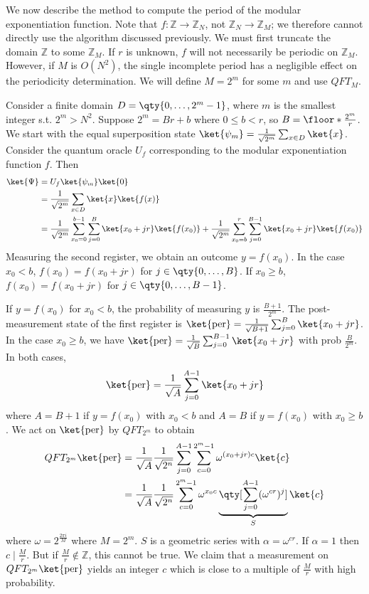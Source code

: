We now describe the method to compute the period of the modular exponentiation function.
Note that $f \colon \mathbb Z \to \mathbb Z_N$, not $\mathbb Z_N \to \mathbb Z_M$; we therefore cannot directly use the algorithm discussed previously.
We must first truncate the domain $\mathbb Z$ to some $\mathbb Z_M$.
If $r$ is unknown, $f$ will not necessarily be periodic on $\mathbb Z_M$.
However, if $M$ is $O(N^2)$, the single incomplete period has a negligible effect on the periodicity determination.
We will define $M = 2^m$ for some $m$ and use $QFT_M$.

Consider a finite domain $D = \qty{0, \dots, 2^m - 1}$, where $m$ is the smallest integer s.t. $2^m > N^2$.
Suppose $2^m = Br + b$ where $0 \leq b < r$, so $B = \floor*{\frac{2^m}{r}}$.
We start with the equal superposition state $\ket{\psi_m} = \frac{1}{\sqrt{2^m}} \sum_{x \in D} \ket{x}$.
Consider the quantum oracle $U_f$ corresponding to the modular exponentiation function $f$.
Then
\begin{align*}
    \ket{\Psi} &= U_f \ket{\psi_m} \ket{0} \\
    &= \frac{1}{\sqrt{2^m}} \sum_{x \in D} \ket{x} \ket{f(x)} \\
    &= \frac{1}{\sqrt{2^m}} \sum_{x_0 = 0}^{b-1} \sum_{j=0}^B \ket{x_0 + jr} \ket{f(x_0)} + \frac{1}{\sqrt{2^m}} \sum_{x_0 = b}^r \sum_{j=0}^{B-1} \ket{x_0 + jr}\ket{f(x_0)}
\end{align*}
Measuring the second register, we obtain an outcome $y = f(x_0)$.
In the case $x_0 < b$, $f(x_0) = f(x_0 + jr)$ for $j \in \qty{0, \dots, B}$.
If $x_0 \geq b$, $f(x_0) = f(x_0 + jr)$ for $j \in \qty{0, \dots, B - 1}$.

If $y = f(x_0)$ for $x_0 < b$, the probability of measuring $y$ is $\frac{B+1}{2^m}$.
The post-measurement state of the first register is $\ket{\mathrm{per}} = \frac{1}{\sqrt{B+1}} \sum_{j=0}^B \ket{x_0 + jr}$.
In the case $x_0 \geq b$, we have $\ket{\mathrm{per}} = \frac{1}{\sqrt{B}} \sum_{j=0}^{B-1} \ket{x_0 + jr}$ with prob $\frac{B}{2^m}$.
In both cases,
\[ \ket{\mathrm{per}} = \frac{1}{\sqrt{A}} \sum_{j=0}^{A-1} \ket{x_0 + jr} \]
where $A = B+1$ if $y = f(x_0)$ with $x_0 < b$ and $A = B$ if $y = f(x_0)$ with $x_0 \geq b$.
We act on $\ket{\mathrm{per}}$ by $QFT_{2^m}$ to obtain
\begin{align*}
    QFT_{2^m} \ket{\mathrm{per}} &= \frac{1}{\sqrt{A}} \frac{1}{\sqrt{2^n}} \sum_{j = 0}^{A-1} \sum_{c=0}^{2^m - 1} \omega^{(x_0 + jr)c}\ket{c} \\
    &=  \frac{1}{\sqrt{A}} \frac{1}{\sqrt{2^n}} \sum_{c=0}^{2^m - 1} \omega^{x_0 c} \underbrace{\qty[\sum_{j = 0}^{A-1} (\omega^{cr})^j]}_{S} \ket{c}
\end{align*}
where $\omega = 2^{\frac{2\pi i}{M}}$ where $M = 2^m$.
$S$ is a geometric series with $\alpha = \omega^{cr}$.
If $\alpha = 1$ then $c \mid \frac{M}{r}$.
But if $\frac{M}{r} \not\in \mathbb Z$, this cannot be true.
We claim that a measurement on $QFT_{2^m} \ket{\mathrm{per}}$ yields an integer $c$ which is close to a multiple of $\frac{M}{r}$ with high probability.

